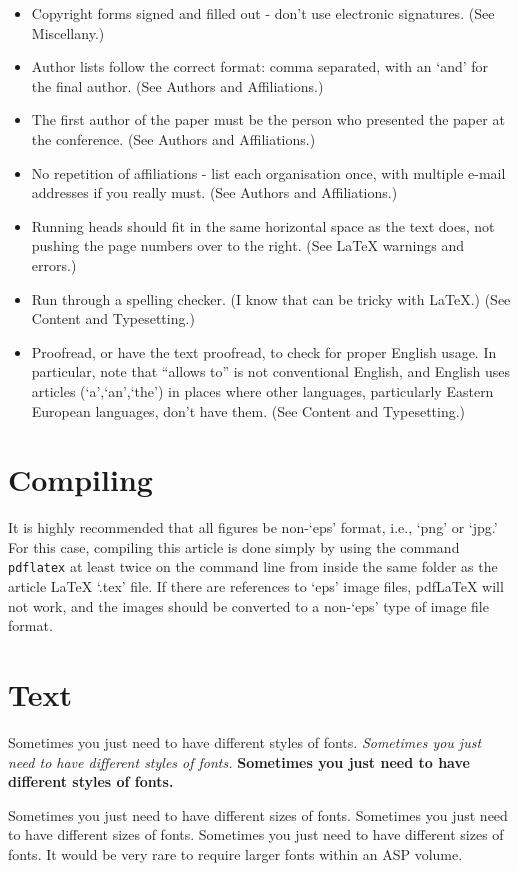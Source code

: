 \documentclass[11pt,twoside]{article}
\begin{document}
\begin{itemize}
\item Copyright forms signed and filled out - don't use electronic signatures. (See Miscellany.)
\item Author lists follow the correct format: comma separated, with an `and' for the final author. (See Authors and Affiliations.)
\item The first author of the paper must be the person who presented the paper at the conference. (See Authors and Affiliations.)
\item No repetition of affiliations - list each organisation once, with multiple e-mail addresses if you really must. (See Authors and Affiliations.)
\item Running heads should fit in the same horizontal space as the text does, not pushing the page numbers over to the right. (See LaTeX warnings and errors.)
\item Run through a spelling checker. (I know that can be tricky with LaTeX.) (See Content and Typesetting.)
\item Proofread, or have the text proofread, to check for proper English usage. In particular, note that ``allows to'' is not conventional English, and English uses articles (`a',`an',`the') in places where other languages, particularly Eastern European languages, don't have them. (See Content and Typesetting.)
\end{itemize}

\section{Compiling}
It is highly recommended that all figures be non-`eps' format, i.e., `png' or `jpg.'  For this case, compiling this article is done simply by using the command \texttt{pdflatex} at least twice on the command line from inside the same folder as the article LaTeX `.tex' file.  If there are references to `eps' image files, pdfLaTeX will not work, and the images should be converted to a non-`eps' type of image file format.

\section{Text}
Sometimes you just need to have different styles of fonts.  \emph{Sometimes you just need to have different styles of fonts.} \textbf{Sometimes you just need to have different styles of fonts.}

Sometimes you just need to have different sizes of fonts.  {\small Sometimes you just need to have different sizes of fonts.} {\footnotesize Sometimes you just need to have different sizes of fonts.}  It would be very rare to require larger fonts within an ASP volume.
\end{document}
